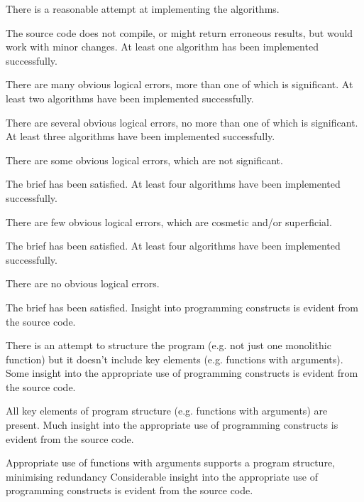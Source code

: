 \documentclass{../../fal_assignment}
\begin{document}
\begin{markingrubric}
        \grade\fail 	There is a reasonable attempt at implementing the algorithms.
            \par 		The source code does not compile, or might return erroneous results, but would work with minor changes.
        \grade 		At least one algorithm has been implemented successfully.
            \par 		There are many obvious logical errors, more than one of which is significant.   
        \grade 		At least two algorithms have been  implemented successfully.
            \par 		There are several obvious logical errors, no more than one of which is significant. 
        \grade 		At least three algorithms have been implemented successfully.
            \par 		There are some obvious logical errors, which are not significant. 
            \par		The brief has been satisfied.
        \grade 		At least four algorithms have been implemented successfully.
            \par 		There are few obvious logical errors, which are cosmetic and/or superficial.
            \par		The brief has been satisfied.     
        \grade 		At least four algorithms have been implemented successfully.
            \par		There are no obvious logical errors.
            \par		The brief has been satisfied.
%
        \grade\fail Insight into programming constructs is evident from the source code.
            \par There is an attempt to structure the program (e.g. not just one monolithic function) but it doesn't include key elements (e.g. functions with arguments).
        \grade Some insight into the appropriate use of programming constructs is evident from the source code.
            \par All key elements of program structure (e.g. functions with arguments) are present.
        \grade Much insight into the appropriate use of programming constructs is evident from the source code.
            \par Appropriate use of functions with arguments supports a program structure, minimising redundancy
        \grade Considerable insight into the appropriate use of programming constructs is evident from the source code.

\end{markingrubric}
\end{document}
